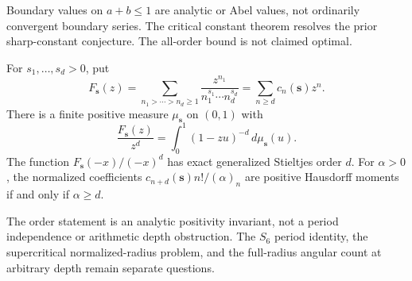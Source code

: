 Boundary values on $a+b\le1$ are analytic or Abel values, not ordinarily
convergent boundary series. The critical constant theorem resolves the
prior sharp-constant conjecture. The all-order bound is not claimed optimal.

\begin{theorem}
\label{compensated:thm:depth}
For $s_1,\ldots,s_d>0$, put
\[
 F_{\boldsymbol s}(z)=
 \sum_{n_1>\cdots>n_d\ge1}\frac{z^{n_1}}{n_1^{s_1}\cdots n_d^{s_d}}
 =\sum_{n\ge d}c_n(\boldsymbol s)z^n.
\]
There is a finite positive measure $\mu_{\boldsymbol s}$ on $(0,1)$ with
\[
 \frac{F_{\boldsymbol s}(z)}{z^d}
 =\int_0^1(1-zu)^{-d}\,d\mu_{\boldsymbol s}(u).
\]
The function $F_{\boldsymbol s}(-x)/(-x)^d$ has exact generalized
Stieltjes order $d$. For $\alpha>0$, the normalized coefficients
$c_{n+d}(\boldsymbol s)n!/(\alpha)_n$ are positive Hausdorff moments
if and only if $\alpha\ge d$.
\end{theorem}
The order statement is an analytic positivity invariant, not a period
independence or arithmetic depth obstruction. The $S_6$ period identity,
the supercritical normalized-radius problem, and the full-radius
angular count at arbitrary depth remain separate questions.
